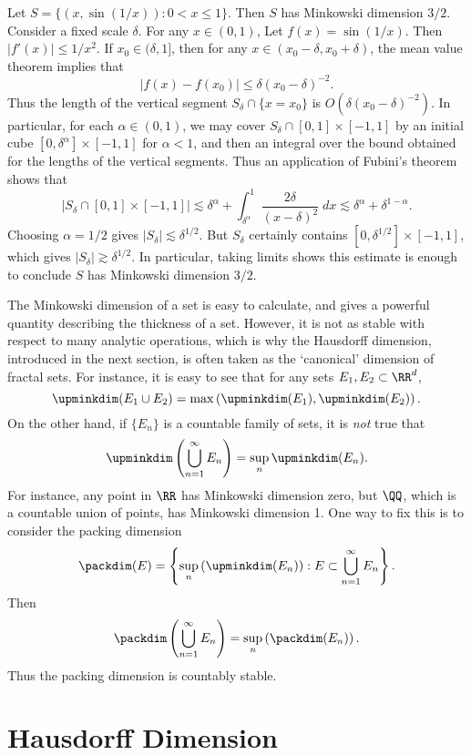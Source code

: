 \begin{example}
	Let $S = \{ (x,\sin(1/x)) : 0 < x \leq 1 \}$. Then $S$ has Minkowski dimension $3/2$. Consider a fixed scale $\delta$. For any $x \in (0,1)$, Let $f(x) = \sin(1/x)$. Then $|f'(x)| \leq 1/x^2$. If $x_0 \in (\delta,1]$, then for any $x \in (x_0-\delta,x_0 + \delta)$, the mean value theorem implies that
	\[ |f(x) - f(x_0)| \leq \delta (x_0 - \delta)^{-2}. \]
	Thus the length of the vertical segment $S_\delta \cap \{ x = x_0 \}$ is $O(\delta (x_0 - \delta)^{-2})$. In particular, for each $\alpha \in (0,1)$, we may cover $S_\delta \cap [0,1] \times [-1,1]$ by an initial cube $[0, \delta^\alpha] \times [-1,1]$ for $\alpha < 1$, and then an integral over the bound obtained for the lengths of the vertical segments. Thus an application of Fubini's theorem shows that
	\[ |S_\delta \cap [0,1] \times [-1,1]| \lesssim \delta^\alpha + \int_{\delta^\alpha}^1 \frac{2\delta}{(x - \delta)^2}\; dx \lesssim \delta^\alpha + \delta^{1-\alpha}. \]
	Choosing $\alpha = 1/2$ gives $|S_\delta| \lesssim \delta^{1/2}$. But $S_\delta$ certainly contains $[0,\delta^{1/2}] \times [-1,1]$, which gives $|S_\delta| \gtrsim \delta^{1/2}$. In particular, taking limits shows this estimate is enough to conclude $S$ has Minkowski dimension $3/2$.
\end{example}

The Minkowski dimension of a set is easy to calculate, and gives a powerful quantity describing the thickness of a set. However, it is not as stable with respect to many analytic operations, which is why the Hausdorff dimension, introduced in the next section, is often taken as the `canonical' dimension of fractal sets. For instance, it is easy to see that for any sets $E_1, E_2 \subset \RR^d$,
%
\[ \upminkdim(E_1 \cup E_2) = \max \left( \upminkdim(E_1), \upminkdim(E_2) \right). \]
%
On the other hand, if $\{ E_n \}$ is a countable family of sets, it is \emph{not} true that
%
\[ \upminkdim \left( \bigcup_{n = 1}^\infty E_n \right) = \sup_n \upminkdim(E_n). \]
%
For instance, any point in $\RR$ has Minkowski dimension zero, but $\QQ$, which is a countable union of points, has Minkowski dimension 1. One way to fix this is to consider the packing dimension
%
\[ \packdim(E) = \left\{ \sup_n \left( \upminkdim(E_n) \right) : E \subset \bigcup_{n = 1}^\infty E_n \right\}. \]
%
Then
%
\[ \packdim \left( \bigcup_{n = 1}^\infty E_n \right) = \sup_n \left( \packdim(E_n) \right). \]
%
Thus the packing dimension is countably stable.

\section{Hausdorff Dimension}

